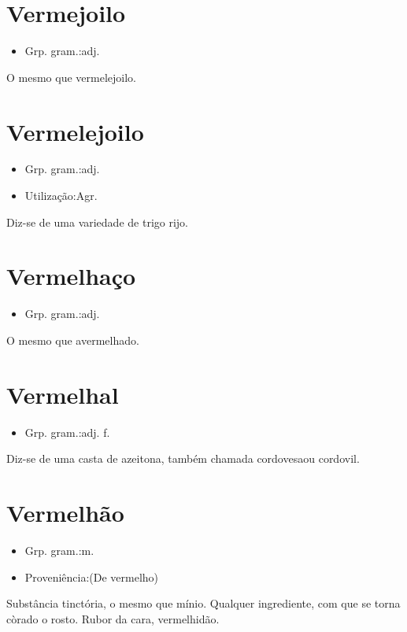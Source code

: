 \documentclass{article}
\begin{document}
\section{Vermejoilo}
\begin{itemize}
\item {Grp. gram.:adj.}
\end{itemize}
O mesmo que \textunderscore vermelejoilo\textunderscore .
\section{Vermelejoilo}
\begin{itemize}
\item {Grp. gram.:adj.}
\end{itemize}
\begin{itemize}
\item {Utilização:Agr.}
\end{itemize}
Diz-se de uma variedade de trigo rijo.
\section{Vermelhaço}
\begin{itemize}
\item {Grp. gram.:adj.}
\end{itemize}
O mesmo que \textunderscore avermelhado\textunderscore .
\section{Vermelhal}
\begin{itemize}
\item {Grp. gram.:adj. f.}
\end{itemize}
Diz-se de uma casta de azeitona, também chamada \textunderscore cordovesa\textunderscore  ou \textunderscore cordovil\textunderscore .
\section{Vermelhão}
\begin{itemize}
\item {Grp. gram.:m.}
\end{itemize}
\begin{itemize}
\item {Proveniência:(De \textunderscore vermelho\textunderscore )}
\end{itemize}
Substância tinctória, o mesmo que \textunderscore mínio\textunderscore .
Qualquer ingrediente, com que se torna còrado o rosto.
Rubor da cara, vermelhidão.
\end{document}
